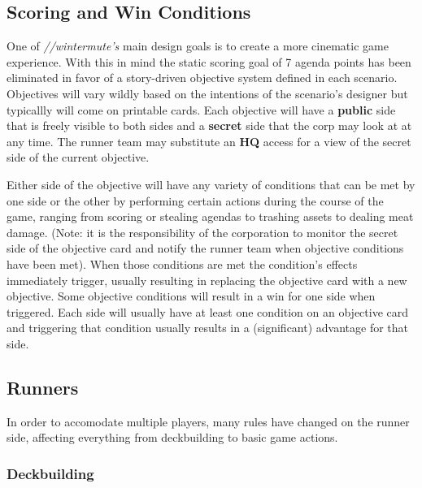 \documentclass[titlepage]{article}
\begin{document}
\subsection{Scoring and Win Conditions}

One of \emph{//wintermute's} main design goals is to create a more cinematic game experience. With this in mind the static scoring goal of 7 agenda points has been eliminated in favor of a story-driven objective system defined in each scenario. Objectives will vary wildly based on the intentions of the scenario's designer but typicallly will come on printable cards. Each objective will have a \textbf{public} side that is freely visible to both sides and a \textbf{secret} side that the corp may look at at any time. The runner team may substitute an \textbf{HQ} access for a view of the secret side of the current objective.

Either side of the objective will have any variety of conditions that can be met by one side or the other by performing certain actions during the course of the game, ranging from scoring or stealing agendas to trashing assets to dealing meat damage. (Note: it is the responsibility of the corporation to monitor the secret side of the objective card and notify the runner team when objective conditions have been met). When those conditions are met the condition's effects immediately trigger, usually resulting in replacing the objective card with a new objective. Some objective conditions will result in a win for one side when triggered. Each side will usually have at least one condition on an objective card and triggering that condition usually results in a (significant) advantage for that side. 

\subsection{Runners}

In order to accomodate multiple players, many rules have changed on the runner side, affecting everything from deckbuilding to basic game actions.

\subsubsection{Deckbuilding}
\end{document}
